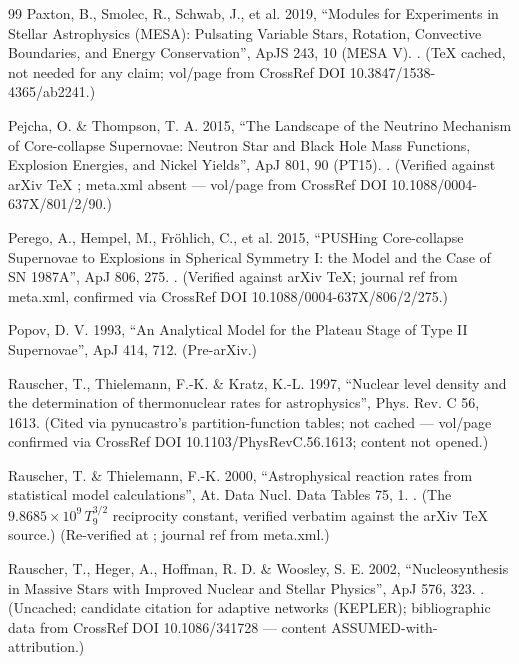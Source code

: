 \begin{thebibliography}{99}
Paxton, B., Smolec, R., Schwab, J., et al. 2019, ``Modules for Experiments in Stellar Astrophysics (MESA): Pulsating Variable Stars, Rotation, Convective Boundaries, and Energy Conservation'', ApJS 243, 10 (MESA V). . (TeX cached, not needed for any claim; vol/page from CrossRef DOI 10.3847/1538-4365/ab2241.)

Pejcha, O. \& Thompson, T. A. 2015, ``The Landscape of the Neutrino Mechanism of Core-collapse Supernovae: Neutron Star and Black Hole Mass Functions, Explosion Energies, and Nickel Yields'', ApJ 801, 90 (PT15). . (Verified against arXiv TeX ; meta.xml absent --- vol/page from CrossRef DOI 10.1088/0004-637X/801/2/90.)

Perego, A., Hempel, M., Fr\"ohlich, C., et al. 2015, ``PUSHing Core-collapse Supernovae to Explosions in Spherical Symmetry I: the Model and the Case of SN 1987A'', ApJ 806, 275. . (Verified against arXiv TeX; journal ref from meta.xml, confirmed via CrossRef DOI 10.1088/0004-637X/806/2/275.)

Popov, D. V. 1993, ``An Analytical Model for the Plateau Stage of Type II Supernovae'', ApJ 414, 712. (Pre-arXiv.)

Rauscher, T., Thielemann, F.-K. \& Kratz, K.-L. 1997, ``Nuclear level density and the determination of thermonuclear rates for astrophysics'', Phys. Rev. C 56, 1613. (Cited via pynucastro's  partition-function tables; not cached --- vol/page confirmed via CrossRef DOI 10.1103/PhysRevC.56.1613; content not opened.)

Rauscher, T. \& Thielemann, F.-K. 2000, ``Astrophysical reaction rates from statistical model calculations'', At. Data Nucl. Data Tables 75, 1. . (The $9.8685\times10^{9}\,T_9^{3/2}$ reciprocity constant, verified verbatim against the arXiv TeX source.) (Re-verified at ; journal ref from meta.xml.)

Rauscher, T., Heger, A., Hoffman, R. D. \& Woosley, S. E. 2002, ``Nucleosynthesis in Massive Stars with Improved Nuclear and Stellar Physics'', ApJ 576, 323. . (Uncached; candidate citation for adaptive networks (KEPLER); bibliographic data from CrossRef DOI 10.1086/341728 --- content ASSUMED-with-attribution.)


\end{thebibliography}
